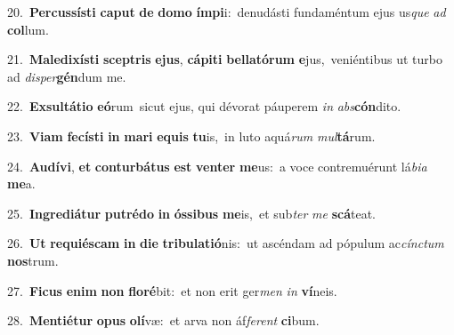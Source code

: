 {{\numbfont\textcolor{\numbcolor}{20.}}~\-\textbf{Per}\-\textbf{cus}\textbf{sís}\textbf{ti} \textbf{ca}\-\textbf{put} \textbf{de} \textbf{do}\-\textbf{mo} \textbf{ím}\-\textbf{pi}i:~\star denudásti fundaméntum ejus us\textit{que} \textit{ad} \textbf{col}\-lum.\par
{\numbfont\textcolor{\numbcolor}{21.}}~\-\textbf{Ma}\-\textbf{le}\textbf{di}\textbf{xís}\textbf{ti} \textbf{scep}\-\textbf{tris} \textbf{e}\-\textbf{jus}, \textbf{cá}\-\textbf{pi}\textbf{ti} \textbf{bel}\-\textbf{la}\textbf{tó}\textbf{rum} \textbf{e}\-jus,~\star veniéntibus ut turbo ad \textit{di}\-\textit{sper}\textbf{gén}dum me.\par
{\numbfont\textcolor{\numbcolor}{22.}}~\-\textbf{Ex}\-\textbf{sul}\textbf{tá}\textbf{ti}\textbf{o} \textbf{e}\-\textbf{ó}rum~\star sicut ejus, qui dévorat páuperem \textit{in} \textit{abs}\-\textbf{cón}dito.\par
{\numbfont\textcolor{\numbcolor}{23.}}~\-\textbf{Vi}\-\textbf{am} \textbf{fe}\-\textbf{cís}\textbf{ti} \textbf{in} \textbf{ma}\-\textbf{ri} \textbf{e}\-\textbf{quis} \textbf{tu}\-is,~\star in luto aquá\textit{rum} \textit{mul}\-\textbf{tá}rum.\par
{\numbfont\textcolor{\numbcolor}{24.}}~\-\textbf{Au}\-\textbf{dí}\textbf{vi}, \textbf{et} \textbf{con}\-\textbf{tur}\textbf{bá}\textbf{tus} \textbf{est} \textbf{ven}\-\textbf{ter} \textbf{me}\-us:~\star a voce contremuérunt lá\-\textit{bi}\-\textit{a} \textbf{me}\-a.\par
{\numbfont\textcolor{\numbcolor}{25.}}~\-\textbf{In}\-\textbf{gre}\textbf{di}\textbf{á}\textbf{tur} \textbf{pu}\-\textbf{tré}\textbf{do} \textbf{in} \textbf{ós}\-\textbf{si}\textbf{bus} \textbf{me}\-is,~\star et sub\textit{ter} \textit{me} \textbf{scá}\-teat.\par
{\numbfont\textcolor{\numbcolor}{26.}}~\textbf{Ut} \textbf{re}\-\textbf{qui}\textbf{és}\textbf{cam} \textbf{in} \textbf{di}\-\textbf{e} \textbf{tri}\-\textbf{bu}\textbf{la}\textbf{ti}\textbf{ó}nis:~\star ut ascéndam ad pópulum ac\-\textit{cínc}\-\textit{tum} \textbf{nos}\-trum.\par
{\numbfont\textcolor{\numbcolor}{27.}}~\-\textbf{Fi}\-\textbf{cus} \textbf{e}\-\textbf{nim} \textbf{non} \textbf{flo}\-\textbf{ré}bit:~\star et non erit ger\textit{men} \textit{in} \textbf{ví}\-neis.\par
{\numbfont\textcolor{\numbcolor}{28.}}~\-\textbf{Men}\-\textbf{ti}\textbf{é}\textbf{tur} \textbf{o}\-\textbf{pus} \textbf{o}\-\textbf{lí}væ:~\star et arva non áf\-\textit{fe}\-\textit{rent} \textbf{ci}\-bum.\par
}
